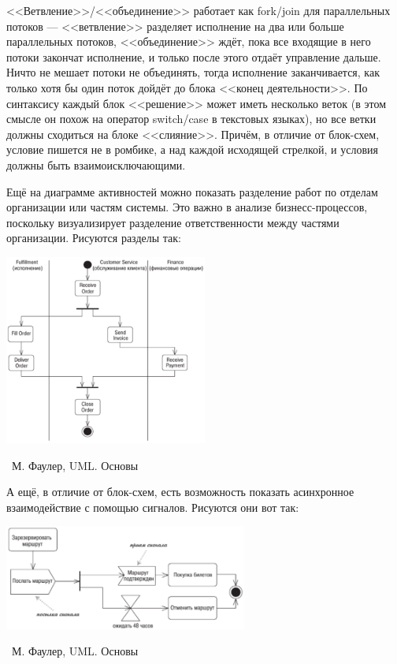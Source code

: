 \documentclass[a5paper]{article}
\newcommand{\attribution}[1] {
    \vspace{-4mm}\begin{flushright}\begin{scriptsize}%
    {\textcopyright\, #1}\end{scriptsize}\end{flushright}
}
\begin{document}
<<Ветвление>>/<<объединение>> работает как fork/join для параллельных потоков --- <<ветвление>> разделяет исполнение на два или больше параллельных потоков, <<объединение>> ждёт, пока все входящие в него потоки закончат исполнение, и только после этого отдаёт управление дальше. Ничто не мешает потоки не объединять, тогда исполнение заканчивается, как только хотя бы один поток дойдёт до блока <<конец деятельности>>. По синтаксису каждый блок <<решение>> может иметь несколько веток (в этом смысле он похож на оператор switch/case в текстовых языках), но все ветки должны сходиться на блоке <<слияние>>. Причём, в отличие от блок-схем, условие пишется не в ромбике, а над каждой исходящей стрелкой, и условия должны быть взаимоисключающими.

Ещё на диаграмме активностей можно показать разделение работ по отделам организации или частям системы. Это важно в анализе бизнесс-процессов, поскольку визуализирует разделение ответственности между частями организации. Рисуются разделы так:

\begin{center}
    \includegraphics[width=0.5\textwidth]{activitySwimlanes.png}
    \attribution{М. Фаулер, UML. Основы}
\end{center}

А ещё, в отличие от блок-схем, есть возможность показать асинхронное взаимодействие с помощью сигналов. Рисуются они вот так:

\begin{center}
    \includegraphics[width=0.6\textwidth]{activitySignals.png}
    \attribution{М. Фаулер, UML. Основы}
\end{center}
\end{document}
